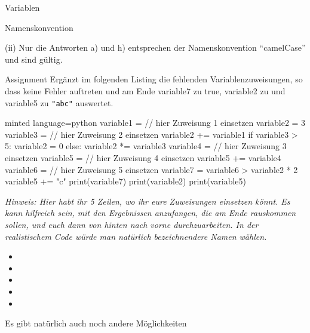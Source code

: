 \begin{task}[points=auto]{Variablen }
\begin{subtask*}[points=0]{Namenskonvention}
\begin{solution}
            (ii) Nur die Antworten a) und h) entsprechen der Namenskonvention \enquote{camelCase} und sind gültig.
        \end{solution}
    \end{subtask*}
    \begin{subtask*}[points=0]{Assignment}
        Ergänzt im folgenden Listing die fehlenden Variablenzuweisungen, so dass keine Fehler auftreten und am Ende {\ttfamily variable7} zu {\ttfamily true}, {\ttfamily variable2} zu {} und {\ttfamily variable5} zu {\ttfamily \verb+"abc"+} auswertet.
        \begin{codeBlock}[]{minted language=python}
            variable1 = // hier Zuweisung 1 einsetzen
            variable2 = 3
            variable3 = // hier Zuweisung 2 einsetzen
            variable2 += variable1
            if variable3 > 5:
                variable2 = 0
            else:
                variable2 *= variable3
            variable4 = // hier Zuweisung 3 einsetzen
            variable5 = // hier Zuweisung 4 einsetzen
            variable5 += variable4
            variable6 = // hier Zuweisung 5 einsetzen
            variable7 = variable6 > variable2 * 2
            variable5 += "c"
            print(variable7)
            print(variable2)
            print(variable5)
        \end{codeBlock}

        \textit{Hinweis: Hier habt ihr 5 Zeilen, wo ihr eure Zuweisungen einsetzen könnt. Es kann hilfreich sein, mit den Ergebnissen anzufangen, die am Ende rauskommen sollen, und euch dann von hinten nach vorne durchzuarbeiten. In der realistischem Code würde man natürlich bezeichnendere Namen wählen.}

        \begin{solution}
            \begin{itemize}
                \item {}
                \item {}
                \item {}
                \item {}
                \item {}
            \end{itemize}
            Es gibt natürlich auch noch andere Möglichkeiten
        \end{solution}
    \end{subtask*}
\end{task}
